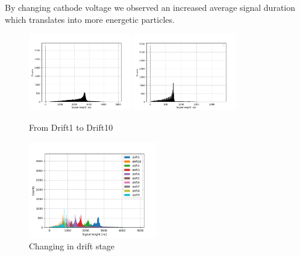 \documentclass[a4paper,twoside,openany]{book}
\begin{document}
By changing cathode voltage we observed an increased average signal duration which translates into more energetic particles.

\begin{figure}[H]
\centering
\includegraphics[width=0.4\textwidth, height=0.3\textwidth]{Histo_drift1}
\includegraphics[width=0.4\textwidth, height=0.3\textwidth]{Histo_drift10}
\caption{From Drift1 to Drift10}
\end{figure}

\begin{figure}[H]
\centering
\includegraphics[width=0.5\textwidth, height=0.4\textwidth]{Histo_drift}
\caption{Changing in drift stage}
\end{figure}
\end{document}
